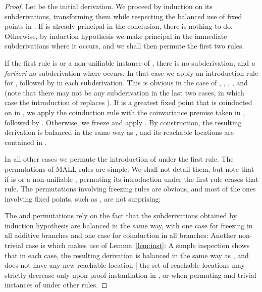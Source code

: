 \begin{proof}
Let  be the initial derivation.
We proceed by induction on its subderivations,
transforming them while respecting the balanced use of fixed points
in .
If  is already principal in the conclusion, there is nothing to do.
Otherwise, by induction hypothesis
we make  principal in the immediate subderivations where it occurs,
and we shall then permute the first two rules.

If the first rule 
is  or a non-unifiable instance of , there is no subderivation,
and \emph{a fortiori} no subderivation where  occurs.
In that case we apply an introduction rule for ,
followed by  in each subderivation.
This is obvious in the case of , , , ,
 and  (note that there may not be any subderivation in the last
two cases, in which case the introduction of  replaces ).
If  is a greatest fixed point that is coinducted on in ,
we apply the coinduction rule with the coinvariance premise taken in ,
followed by .
Otherwise, we freeze  and apply .
By construction, the resulting derivation is balanced in the same way as
, and its reachable locations are contained in .

In all other cases we permute the introduction of  under the first rule.
The permutations of MALL rules are simple. We shall not detail them, but
note that if  is  or a non-unifiable , permuting
its introduction under the first rule erases that rule.
The permutations involving freezing rules are obvious,
and most of the ones involving fixed points, such as ,
are not surprising:

The  and  permutations
rely on the fact that the subderivations obtained by induction hypothesis
are balanced in the same way,
with one case for freezing in all additive branches
and one case for coinduction in all branches:
Another non-trivial case is  which makes use of
Lemma~\ref{lem:inst}:  A simple inspection shows that in each case,
the resulting derivation is balanced in the same way as ,
and does not have any new reachable location |
the set of reachable locations may strictly decrease only
upon proof instantiation in ,
or when permuting  and trivial instances of  under
other rules.
\end{proof}

